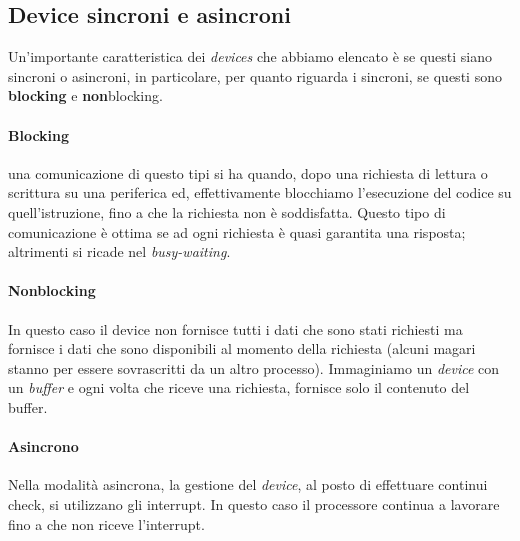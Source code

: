 % 
\subsection{Device sincroni e asincroni}
Un'importante caratteristica dei \textit{devices} che abbiamo elencato è se questi siano sincroni o asincroni, in particolare, per quanto riguarda i sincroni, se questi sono \textbf{blocking} e \textbf{non}blocking.

\paragraph{Blocking} una comunicazione di questo tipi si ha quando, dopo una richiesta di lettura o scrittura su una periferica ed, effettivamente blocchiamo l'esecuzione del codice su quell'istruzione, fino a che la richiesta non è soddisfatta. Questo tipo di comunicazione è ottima se ad ogni richiesta è quasi garantita una risposta; altrimenti si ricade nel \textit{busy-waiting}.

\paragraph{Nonblocking} In questo caso il device non fornisce tutti i dati che sono stati richiesti ma fornisce i dati che sono disponibili al momento della richiesta (alcuni magari stanno per essere sovrascritti da un altro processo). Immaginiamo un \textit{device} con un \textit{buffer} e ogni volta che riceve una richiesta, fornisce solo il contenuto del buffer.

\paragraph{Asincrono} Nella modalità asincrona, la gestione del \textit{device}, al posto di effettuare continui check, si utilizzano gli interrupt. In questo caso il processore continua a lavorare fino a che non riceve l'interrupt. 

% 
